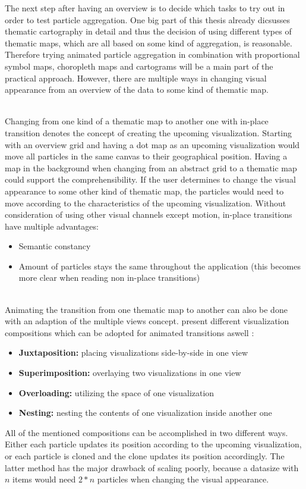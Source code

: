 The next step after having an overview is to decide which tasks to try out in order to test particle aggregation. One big part of this thesis already dicsusses thematic cartography in detail and thus the decision of using different types of thematic maps, which are all based on some kind of aggregation, is reasonable. Therefore trying animated particle aggregation in combination with proportional symbol maps, choropleth maps and cartograms will be a main part of the practical approach. However, there are multiple ways in changing visual appearance from an overview of the data to some kind of thematic map.

\begin{enumerate}

 \hfill \\
Changing from one kind of a thematic map to another one with in-place transition denotes the concept of creating the upcoming visualization. Starting with an overview grid and having a dot map as an upcoming visualization would move all particles in the same canvas to their geographical position. Having a map in the background when changing from an abstract grid to a thematic map could support the comprehensibility.
If the user determines to change the visual appearance to some other kind of thematic map, the particles would need to move according to the characteristics of the upcoming visualization. Without consideration of using other visual channels except motion, in-place transitions have multiple advantages:
\begin{itemize}
\item Semantic constancy
\item Amount of particles stays the same throughout the application (this becomes more clear when reading non in-place transitions)
\end{itemize}

 \hfill \\
Animating the transition from one thematic map to another can also be done with an adaption of the multiple views concept. \citeauthor{Javed2012} present different visualization compositions which can be adopted for animated transitions aswell :
\begin{itemize}
\item \textbf{Juxtaposition:} placing visualizations side-by-side in one view
\item \textbf{Superimposition:} overlaying two visualizations in one view
\item \textbf{Overloading:} utilizing the space of one visualization
\item \textbf{Nesting:} nesting the contents of one visualization inside another one
\end{itemize}

All of the mentioned compositions can be accomplished in two different ways. Either each particle updates its position according to the upcoming visualization, or each particle is cloned and the clone updates its position accordingly. The latter method has the major drawback of scaling poorly, because a datasize with $n$ items would need $2*n$ particles when changing the visual appearance.
\end{enumerate}

